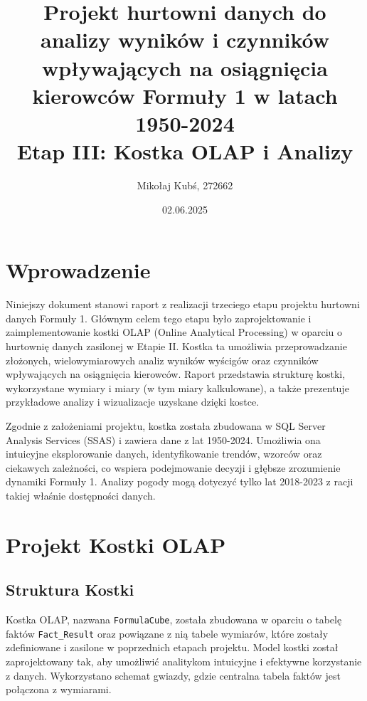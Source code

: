 \documentclass[a4paper,12pt]{article}
\title{Projekt hurtowni danych do analizy wyników i czynników wpływających na osiągnięcia kierowców Formuły 1 w latach 1950-2024 \\ \vspace{0.5em} \large Etap III: Kostka OLAP i Analizy}
\author{Mikołaj Kubś, 272662}
\date{02.06.2025}
\begin{document}
\maketitle
\tableofcontents
\newpage

\section{Wprowadzenie}
Niniejszy dokument stanowi raport z realizacji trzeciego etapu projektu hurtowni danych Formuły 1. Głównym celem tego etapu było zaprojektowanie i zaimplementowanie kostki OLAP (Online Analytical Processing) w oparciu o hurtownię danych zasilonej w Etapie II. Kostka ta umożliwia przeprowadzanie złożonych, wielowymiarowych analiz wyników wyścigów oraz czynników wpływających na osiągnięcia kierowców. Raport przedstawia strukturę kostki, wykorzystane wymiary i miary (w tym miary kalkulowane), a także prezentuje przykładowe analizy i wizualizacje uzyskane dzięki kostce.

Zgodnie z założeniami projektu, kostka została zbudowana w SQL Server Analysis Services (SSAS) i zawiera dane z lat 1950-2024. Umożliwia ona intuicyjne eksplorowanie danych, identyfikowanie trendów, wzorców oraz ciekawych zależności, co wspiera podejmowanie decyzji i głębsze zrozumienie dynamiki Formuły 1. Analizy pogody mogą dotyczyć tylko lat 2018-2023 z racji takiej właśnie dostępności danych.

\section{Projekt Kostki OLAP}

\subsection{Struktura Kostki}
Kostka OLAP, nazwana \texttt{FormulaCube}, została zbudowana w oparciu o tabelę faktów \texttt{Fact\_Result} oraz powiązane z nią tabele wymiarów, które zostały zdefiniowane i zasilone w poprzednich etapach projektu. Model kostki został zaprojektowany tak, aby umożliwić analitykom intuicyjne i efektywne korzystanie z danych. Wykorzystano schemat gwiazdy, gdzie centralna tabela faktów jest połączona z wymiarami.
\end{document}
